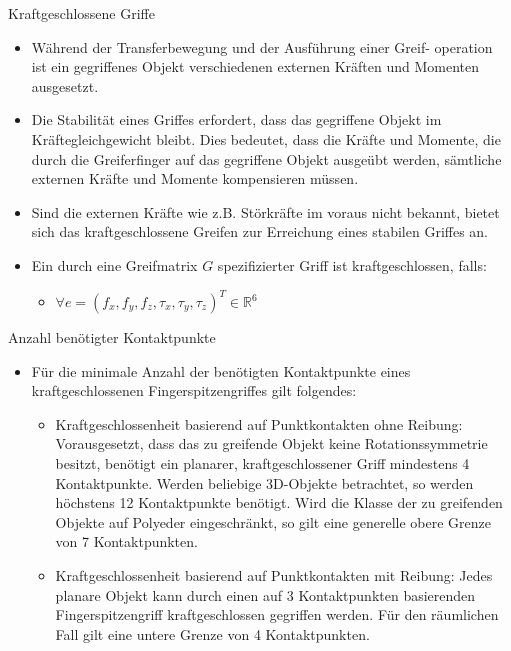 \documentclass[paper=a4, fontsize=11pt]{scrartcl} %
\numberwithin{equation}{section} %
\numberwithin{figure}{section} %
\numberwithin{table}{section} %
\begin{document}
Kraftgeschlossene Griffe
\begin{itemize}
\item Während der Transferbewegung und der Ausführung einer Greif- operation ist ein gegriffenes Objekt verschiedenen externen Kräften und Momenten ausgesetzt.
\item Die Stabilität eines Griffes erfordert, dass das gegriffene Objekt im Kräftegleichgewicht bleibt. Dies bedeutet, dass die Kräfte und Momente, die durch die Greiferfinger auf das gegriffene Objekt ausgeübt werden, sämtliche externen Kräfte und Momente kompensieren müssen.
\item Sind die externen Kräfte wie z.B. Störkräfte im voraus nicht bekannt, bietet sich das kraftgeschlossene Greifen zur Erreichung eines stabilen Griffes an.
\item Ein durch eine Greifmatrix $G$ spezifizierter Griff ist kraftgeschlossen, falls:
\begin{itemize}
\item $\forall e = (f_x,f_y,f_z,\tau_x,\tau_y,\tau_z)^T \in \mathbb{R}^6$
\end{itemize}
\end{itemize}

Anzahl benötigter Kontaktpunkte
\begin{itemize}
\item Für die minimale Anzahl der benötigten Kontaktpunkte eines kraftgeschlossenen Fingerspitzengriffes gilt folgendes:
\begin{itemize}
\item Kraftgeschlossenheit basierend auf Punktkontakten ohne Reibung: Vorausgesetzt, dass das zu greifende Objekt keine Rotationssymmetrie besitzt, benötigt ein planarer, kraftgeschlossener Griff mindestens 4 Kontaktpunkte. Werden beliebige 3D-Objekte betrachtet, so werden höchstens 12 Kontaktpunkte benötigt. Wird die Klasse der zu greifenden Objekte auf Polyeder eingeschränkt, so gilt eine generelle obere Grenze von 7 Kontaktpunkten.
\item Kraftgeschlossenheit basierend auf Punktkontakten mit Reibung: Jedes planare Objekt kann durch einen auf 3 Kontaktpunkten basierenden Fingerspitzengriff kraftgeschlossen gegriffen werden. Für den räumlichen Fall gilt eine untere Grenze von 4 Kontaktpunkten.
\end{itemize}
\end{itemize}
\end{document}
